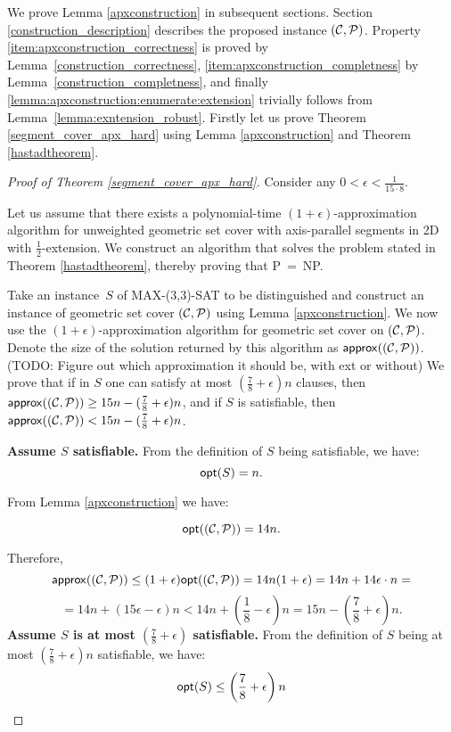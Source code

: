 We prove Lemma \ref{apxconstruction} in
subsequent sections. Section \ref{construction_description}
describes the proposed instance $(\mathcal{C}, \mathcal{P})$.
Property \ref{item:apxconstruction_correctness} is proved by Lemma~\ref{construction_correctness},
\ref{item:apxconstruction_completness} by Lemma~\ref{construction_completness},
and finally \ref{lemma:apxconstruction:enumerate:extension} trivially
follows from Lemma~\ref{lemma:exntension_robust}.
Firstly let us prove
Theorem \ref{segment_cover_apx_hard} using Lemma \ref{apxconstruction}
and Theorem \ref{hastadtheorem}.

\begin{proof}[Proof of Theorem \ref{segment_cover_apx_hard}]
Consider any $0 < \epsilon < \frac{1}{15 \cdot 8}$.

Let us assume that there exists a polynomial-time
$(1+\epsilon)$-approximation algorithm
for unweighted geometric set cover with axis-parallel segments in 2D
with $\frac{1}{2}$-extension.
We construct an algorithm that solves the problem stated in 
Theorem \ref{hastadtheorem}, thereby proving that P~=~NP.

Take an instance~$S$ of MAX-(3,3)-SAT to be distinguished
and construct an instance of geometric set cover $(\mathcal{C}, \mathcal{P})$
using Lemma \ref{apxconstruction}.
We now use the $(1+\epsilon)$-approximation algorithm
for geometric set cover on $(\mathcal{C}, \mathcal{P})$.
Denote the size of the solution returned by this algorithm as $\mathsf{approx}((\mathcal{C}, \mathcal{P}))$.
(TODO: Figure out which approximation it should be, with ext or without)
We prove that 
if in $S$
one can satisfy at most $(\frac{7}{8}+\epsilon)n$ clauses,
then $\mathsf{approx}((\mathcal{C}, \mathcal{P})) \ge 15n - (\frac{7}{8} + \epsilon)n$,
and if $S$ is
satisfiable, then $\mathsf{approx}((\mathcal{C}, \mathcal{P})) < 15n - (\frac{7}{8} + \epsilon)n$.


\textbf{Assume $S$ satisfiable.}
From the definition of $S$ being satisfiable, we have:
$$\mathsf{opt}(S) = n.$$

From Lemma \ref{apxconstruction} we have:

$$\mathsf{opt}((\mathcal{C}, \mathcal{P})) = 14n.$$

Therefore,
$$\mathsf{approx}((\mathcal{C}, \mathcal{P})) \le (1+\epsilon)\mathsf{opt}((\mathcal{C}, \mathcal{P})) = 14n(1+\epsilon)
	= 14n + 14\epsilon\cdot n =$$ 
	$$= 14n + (15\epsilon - \epsilon)n < 
  14n + \left(\frac{1}{8} - \epsilon\right)n 
= 15n - \left(\frac{7}{8} + \epsilon\right)n.$$
\textbf{Assume $S$ is at most 
$\left(\frac{7}{8} + \epsilon\right)$ satisfiable.}
From the definition of $S$ being at most 
$\left(\frac{7}{8} + \epsilon\right)n$ satisfiable, we have:
$$\mathsf{opt}(S) \le \left(\frac{7}{8} + \epsilon\right)n$$


\end{proof}
